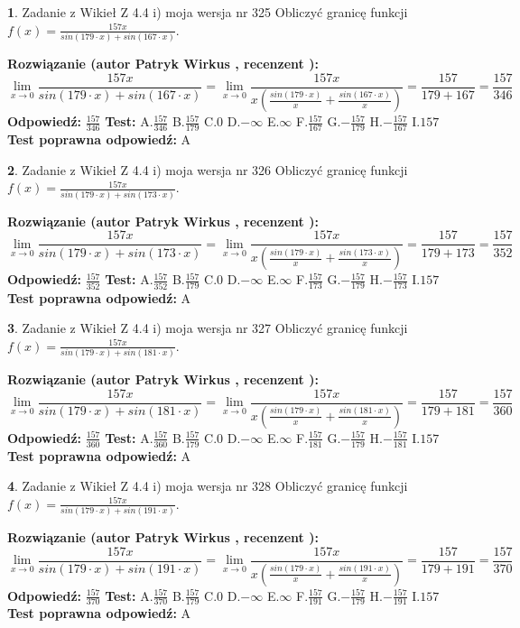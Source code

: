\documentclass[12pt, a4paper]{article}
\theoremstyle{definition} %
\newtheorem{zad}{}
\newcommand{\zadStart}[1]{\begin{zad}#1\newline}
\newcommand{\zadStop}{\end{zad}}
\newcommand{\rozwStart}[2]{\noindent \textbf{Rozwiązanie (autor #1 , recenzent #2): }\newline}
\newcommand{\rozwStop}{\newline}
\newcommand{\odpStart}{\noindent \textbf{Odpowiedź:}\newline}
\newcommand{\odpStop}{\newline}
\newcommand{\testStart}{\noindent \textbf{Test:}\newline}
\newcommand{\testStop}{\newline}
\newcommand{\kluczStart}{\noindent \textbf{Test poprawna odpowiedź:}\newline}
\newcommand{\kluczStop}{\newline}
\begin{document}
\zadStart{Zadanie z Wikieł Z 4.4 i) moja wersja nr 325}
Obliczyć granicę funkcji $f(x)=\frac{157x}{sin(179\cdot x) +sin(167\cdot x)}$.
\zadStop
\rozwStart{Patryk Wirkus}{}
$$\lim\limits_{x\to 0}\frac{157x}{sin(179\cdot x) +sin(167\cdot x)}=\lim\limits_{x\to 0}\frac{157x}{x(\frac{sin(179\cdot x)}{x}+\frac{sin(167\cdot x)}{x})}=\frac{157}{179+167} = \frac{157}{346}$$
\rozwStop
\odpStart
$\frac{157}{346}$
\odpStop
\testStart
A.$\frac{157}{346}$
B.$\frac{157}{179}$
C.$0$
D.$-\infty$
E.$\infty$
F.$\frac{157}{167}$
G.$-\frac{157}{179}$
H.$-\frac{157}{167}$
I.$157$
\testStop
\kluczStart
A
\kluczStop



\zadStart{Zadanie z Wikieł Z 4.4 i) moja wersja nr 326}
Obliczyć granicę funkcji $f(x)=\frac{157x}{sin(179\cdot x) +sin(173\cdot x)}$.
\zadStop
\rozwStart{Patryk Wirkus}{}
$$\lim\limits_{x\to 0}\frac{157x}{sin(179\cdot x) +sin(173\cdot x)}=\lim\limits_{x\to 0}\frac{157x}{x(\frac{sin(179\cdot x)}{x}+\frac{sin(173\cdot x)}{x})}=\frac{157}{179+173} = \frac{157}{352}$$
\rozwStop
\odpStart
$\frac{157}{352}$
\odpStop
\testStart
A.$\frac{157}{352}$
B.$\frac{157}{179}$
C.$0$
D.$-\infty$
E.$\infty$
F.$\frac{157}{173}$
G.$-\frac{157}{179}$
H.$-\frac{157}{173}$
I.$157$
\testStop
\kluczStart
A
\kluczStop



\zadStart{Zadanie z Wikieł Z 4.4 i) moja wersja nr 327}
Obliczyć granicę funkcji $f(x)=\frac{157x}{sin(179\cdot x) +sin(181\cdot x)}$.
\zadStop
\rozwStart{Patryk Wirkus}{}
$$\lim\limits_{x\to 0}\frac{157x}{sin(179\cdot x) +sin(181\cdot x)}=\lim\limits_{x\to 0}\frac{157x}{x(\frac{sin(179\cdot x)}{x}+\frac{sin(181\cdot x)}{x})}=\frac{157}{179+181} = \frac{157}{360}$$
\rozwStop
\odpStart
$\frac{157}{360}$
\odpStop
\testStart
A.$\frac{157}{360}$
B.$\frac{157}{179}$
C.$0$
D.$-\infty$
E.$\infty$
F.$\frac{157}{181}$
G.$-\frac{157}{179}$
H.$-\frac{157}{181}$
I.$157$
\testStop
\kluczStart
A
\kluczStop



\zadStart{Zadanie z Wikieł Z 4.4 i) moja wersja nr 328}
Obliczyć granicę funkcji $f(x)=\frac{157x}{sin(179\cdot x) +sin(191\cdot x)}$.
\zadStop
\rozwStart{Patryk Wirkus}{}
$$\lim\limits_{x\to 0}\frac{157x}{sin(179\cdot x) +sin(191\cdot x)}=\lim\limits_{x\to 0}\frac{157x}{x(\frac{sin(179\cdot x)}{x}+\frac{sin(191\cdot x)}{x})}=\frac{157}{179+191} = \frac{157}{370}$$
\rozwStop
\odpStart
$\frac{157}{370}$
\odpStop
\testStart
A.$\frac{157}{370}$
B.$\frac{157}{179}$
C.$0$
D.$-\infty$
E.$\infty$
F.$\frac{157}{191}$
G.$-\frac{157}{179}$
H.$-\frac{157}{191}$
I.$157$
\testStop
\kluczStart
A
\kluczStop
\end{document}

